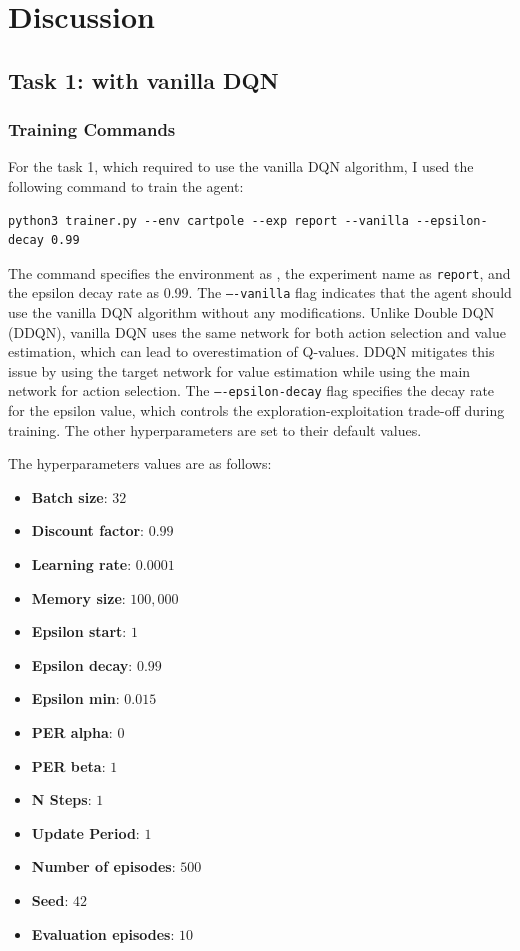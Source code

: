 \section{Discussion}

\subsection{Task 1: \cartpole with vanilla DQN}

\subsubsection{Training Commands}

For the task 1, which required to use the vanilla DQN algorithm, I used the following command to train the agent:

\begin{verbatim}
python3 trainer.py --env cartpole --exp report --vanilla --epsilon-decay 0.99
\end{verbatim}

The command specifies the environment as \cartpole, the experiment name as \texttt{report}, and the epsilon decay rate as 0.99.
The \texttt{----vanilla} flag indicates that the agent should use the vanilla DQN algorithm without any modifications. Unlike Double DQN (DDQN), vanilla DQN uses the same network for both action selection and value estimation, which can lead to overestimation of Q-values. DDQN mitigates this issue by using the target network for value estimation while using the main network for action selection.
The \texttt{----epsilon-decay} flag specifies the decay rate for the epsilon value, which controls the exploration-exploitation trade-off during training.
The other hyperparameters are set to their default values.

The hyperparameters values are as follows:
\begin{itemize}
    \item \textbf{Batch size}: $32$
    \item \textbf{Discount factor}: $0.99$
    \item \textbf{Learning rate}: $0.0001$
    \item \textbf{Memory size}: $100,000$
    \item \textbf{Epsilon start}: $1$
    \item \textbf{Epsilon decay}: $0.99$
    \item \textbf{Epsilon min}: $0.015$
    \item \textbf{PER alpha}: $0$
    \item \textbf{PER beta}: $1$
    \item \textbf{N Steps}: $1$
    \item \textbf{Update Period}: $1$
    \item \textbf{Number of episodes}: $500$
    \item \textbf{Seed}: $42$
    \item \textbf{Evaluation episodes}: $10$
\end{itemize}

